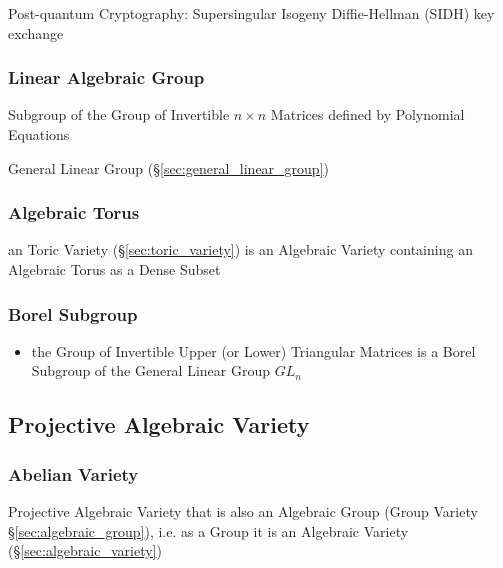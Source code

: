 Post-quantum Cryptography: Supersingular Isogeny Diffie-Hellman (SIDH) key
exchange



\subsubsection{Linear Algebraic Group}\label{sec:linear_algebraic_group}

Subgroup of the Group of Invertible $n \times n$ Matrices defined by Polynomial
Equations

General Linear Group (\S\ref{sec:general_linear_group})



\subsubsection{Algebraic Torus}\label{sec:algebraic_torus}

an Toric Variety (\S\ref{sec:toric_variety}) is an Algebraic Variety containing
an Algebraic Torus as a Dense Subset



\subsubsection{Borel Subgroup}\label{sec:borel_subgroup}

\begin{itemize}
  \item the Group of Invertible Upper (or Lower) Triangular Matrices is a Borel
    Subgroup of the General Linear Group $GL_n$
\end{itemize}



\subsection{Projective Algebraic Variety}
\label{sec:projective_algebraic_variety}

\subsubsection{Abelian Variety}\label{sec:abelian_variety}

Projective Algebraic Variety that is also an Algebraic Group (Group Variety
\S\ref{sec:algebraic_group}), i.e. as a Group it is an Algebraic Variety
(\S\ref{sec:algebraic_variety})

